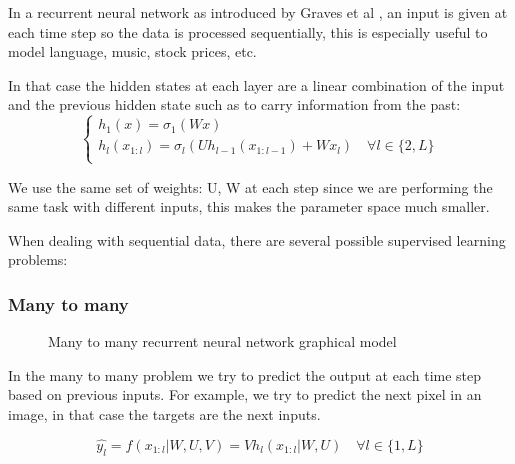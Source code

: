 \documentclass[10pt,oneside,openright]{report}
\begin{document}
In a recurrent neural network as introduced by Graves et al \cite{graves}, an input is given at each time step so the data is processed sequentially, this is especially useful to model language, music, stock prices, etc.

In that case the hidden states at each layer are a linear combination of the input and the previous hidden state such as to carry information from the past:
  \begin{equation}
    \begin{cases}
          h_1(x) = \sigma_1(W x) \\
          h_l(x_{1:l}) = \sigma_l (U h_{l-1}(x_{1:l-1}) + W x_l) \quad \forall l \in \{2, L\}\\
    \end{cases}
  \end{equation}

We use the same set of weights: U, W at each step since we are performing the same task with different inputs, this makes the parameter space much smaller.

When dealing with sequential data, there are several possible supervised learning problems:
\subsubsection{Many to many}
\begin{figure}[H]
\centering
{}
\caption{Many to many recurrent neural network graphical model}
\end{figure}
In the many to many problem we try to predict the output at each time step based on previous inputs. For example, we try to predict the next pixel in an image, in that case the targets are the next inputs.

$$ \hat{y_l} = f(x_{1:l}|W, U, V) = V h_l(x_{1:l}|W,U)\quad \forall l \in \{1, L\}$$
\end{document}
